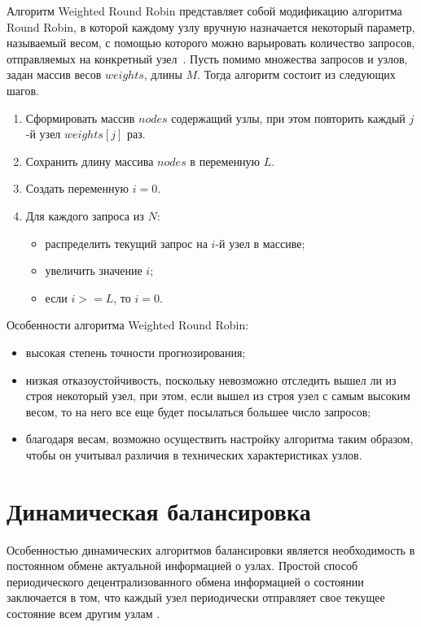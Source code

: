 Алгоритм Weighted Round Robin представляет собой модификацию алгоритма Round Robin, в которой каждому узлу вручную назначается некоторый параметр, называемый весом, с помощью которого можно варьировать количество запросов, отправляемых на конкретный узел~\cite{part_algos}. Пусть помимо множества запросов и узлов, задан массив весов $weights$, длины $M$. Тогда алгоритм состоит из следующих шагов.
\begin{enumerate}
	\item Сформировать массив $nodes$ содержащий узлы, при этом повторить каждый $j$-й узел $weights[j]$ раз.
	\item Сохранить длину массива $nodes$ в переменную $L$.
	\item Создать переменную $i = 0$.
	\item Для каждого запроса из $N$:
	\begin{itemize}
		\item распределить текущий запрос на $i$-й узел в массиве;
		\item увеличить значение $i$;
		\item если $i >= L$, то $i = 0$.
	\end{itemize}	
\end{enumerate}


Особенности алгоритма Weighted Round Robin:
\begin{itemize}
	\item высокая степень точности прогнозирования;
	\item низкая отказоустойчивость, поскольку невозможно отследить вышел ли из строя некоторый узел, при этом, если вышел из строя узел с самым высоким весом, то на него все еще будет посылаться большее число запросов;
	\item благодаря весам, возможно осуществить настройку алгоритма таким образом, чтобы он учитывал различия в технических характеристиках узлов.
\end{itemize}



\section{Динамическая балансировка}

Особенностью динамических алгоритмов балансировки является необходимость в постоянном обмене актуальной информацией о узлах.
Простой способ периодического децентрализованного обмена информацией о состоянии заключается в том, что каждый узел периодически отправляет свое текущее состояние всем другим узлам \cite{drr}.

